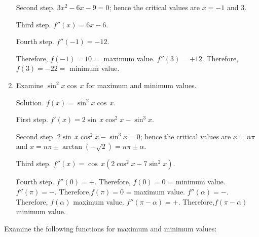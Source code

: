 \begin{enumerate}
Second step, 	$3x^2 - 6x - 9 	= 0$;
hence the critical values are $x = -1$ and $3$.

Third step. 	$f''(x) 	= 6x - 6$.

Fourth step. $f''(-1) 	= -12$.

Therefore, $f(-1) 	= 10 =$  maximum value.
$f''(3) = + 12$. Therefore, $f(3) = - 22 =$ minimum value.

\item
Examine $\sin^2x\cos\, x$ for maximum and minimum values.

Solution. $f(x) = \sin^2x\cos\, x$.

First step. $f'(x) = 2\sin\, x\cos^2x - \sin^3x$.

Second step. $2\sin\, x\cos^2x - \sin^3x = 0$;
hence the critical values are $x = n\pi$
and $x = n\pi \pm \arctan( -\sqrt{2}) = n\pi \pm \alpha$.

Third step. 	$f''(x) = \cos\, x(2\cos^2x - 7\sin^2x)$.

Fourth step. $f''(0) = +$. Therefore,	$f(0)=0$ = minimum value.
  	$f''(\pi) 	= -$. Therefore,$f(\pi) = 0$ = maximum value.
  	$f''(\alpha) 	= -$. Therefore, $f(\alpha)$ maximum value.
  	$f''(\pi - \alpha)= +$. Therefore,$f(\pi - \alpha)$ minimum value.

\end{enumerate}

Examine the following functions for maximum and minimum values:

